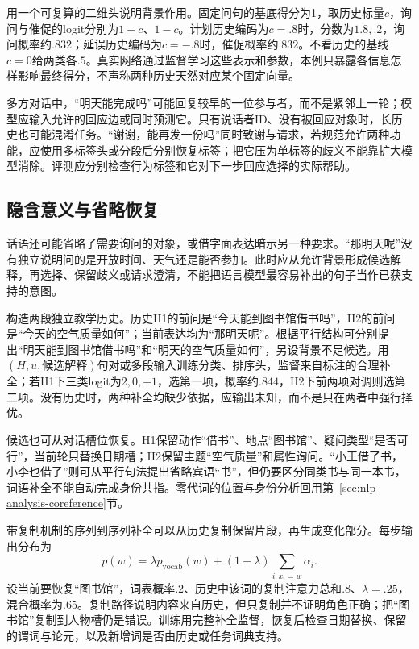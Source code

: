 用一个可复算的二维头说明背景作用。固定问句的基底得分为1，取历史标量$c$，询问与催促的logit分别为$1+c$、$1-c$。计划历史编码为$c=.8$时，分数为$1.8,.2$，询问概率约$.832$；延误历史编码为$c=-.8$时，催促概率约$.832$。不看历史的基线$c=0$给两类各$.5$。真实网络通过监督学习这些表示和参数，本例只暴露各信息怎样影响最终得分，不声称两种历史天然对应某个固定向量。

多方对话中，“明天能完成吗”可能回复较早的一位参与者，而不是紧邻上一轮；模型应输入允许的回应边或同时预测它。只有说话者ID、没有被回应对象时，长历史也可能混淆任务。“谢谢，能再发一份吗”同时致谢与请求，若规范允许两种功能，应使用多标签头或分段后分别恢复标签；把它压为单标签的歧义不能靠扩大模型消除。评测应分别检查行为标签和它对下一步回应选择的实际帮助。

\subsection{隐含意义与省略恢复}
\label{sec:nlp-analysis-implicit-meaning}

话语还可能省略了需要询问的对象，或借字面表达暗示另一种要求。“那明天呢”没有独立说明问的是开放时间、天气还是能否参加。此时应从允许背景形成候选解释，再选择、保留歧义或请求澄清，不能把语言模型最容易补出的句子当作已获支持的意图。

构造两段独立教学历史。历史H1的前问是“今天能到图书馆借书吗”，H2的前问是“今天的空气质量如何”；当前表达均为“那明天呢”。根据平行结构可分别提出“明天能到图书馆借书吗”和“明天的空气质量如何”，另设背景不足候选。用$(H,u,\text{候选解释})$句对或多段输入训练分类、排序头，监督来自标注的合理补全；若H1下三类logit为$2,0,-1$，选第一项，概率约$.844$，H2下前两项对调则选第二项。没有历史时，两种补全均缺少依据，应输出未知，而不是只在两者中强行择优。

候选也可从对话槽位恢复。H1保留动作“借书”、地点“图书馆”、疑问类型“是否可行”，当前轮只替换日期槽；H2保留主题“空气质量”和属性询问。“小王借了书，小李也借了”则可从平行句法提出省略宾语“书”，但仍要区分同类书与同一本书，词语补全不能自动完成身份共指。零代词的位置与身份分析回用第~\ref{sec:nlp-analysis-coreference}节。

带复制机制的序列到序列补全可以从历史复制保留片段，再生成变化部分。每步输出分布为
\[
 p(w)=\lambda p_{\mathrm{vocab}}(w)
 +(1-\lambda)\sum_{i:x_i=w}\alpha_i.
\]
设当前要恢复“图书馆”，词表概率$.2$、历史中该词的复制注意力总和$.8$、$\lambda=.25$，混合概率为$.65$。复制路径说明内容来自历史，但只复制并不证明角色正确；把“图书馆”复制到人物槽仍是错误。训练用完整补全监督，恢复后检查日期替换、保留的谓词与论元，以及新增词是否由历史或任务词典支持。

